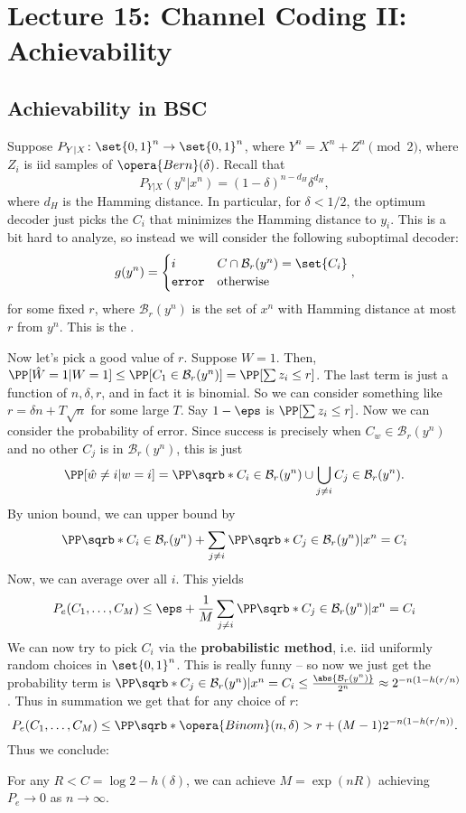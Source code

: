 \section*{Lecture 15: Channel Coding II: Achievability}
\setcounter{section}{15}

\subsection{Achievability in BSC}

Suppose $P_{Y|X} \colon \set{0,1}^n \to \set{0,1}^n$, where $Y^n = X^n + Z^n \pmod 2$, where $Z_i$ is iid samples of $\opera{Bern}(\delta)$.
Recall that \[
	P_{Y|X}(y^n|x^n) = (1-\delta)^{n-d_H} \delta^{d_H},
\]
where $d_H$ is the Hamming distance.
In particular, for $\delta < 1/2$, the optimum decoder just picks the $C_i$ that minimizes the Hamming distance to $y_i$.
This is a bit hard to analyze, so instead we will consider the following suboptimal decoder: \[
	g(y^n) = \begin{cases}
		i & C \cap \mathcal B_r(y^n) = \set{C_i} \\
		\texttt{error} & \text{otherwise}
	\end{cases},
\]
for some fixed $r$,
where $\mathcal B_r(y^n)$ is the set of $x^n$ with Hamming distance at most $r$ from $y^n$.
This is the .

Now let's pick a good value of $r$. Suppose $W = 1$. Then, $\PP[\hat W = 1 | W = 1] \leq \PP[C_1\in \mathcal B_r(y^n)] = \PP[\sum z_i \leq r]$. The last term is just a function of $n,\delta, r$, and in fact it is binomial. So we can consider something like $r = \delta n + T\sqrt n$ for some large $T$. Say $1-\eps$ is $\PP[\sum z_i \leq r]$.
Now we can consider the probability of error. Since success is precisely when $C_w\in \mathcal B_r(y^n)$ and no other $C_j$ is in $\mathcal B_r(y^n)$, this is just \[
	\PP[\hat w \neq i | w=i] = \PP\sqrb*{C_i \in \mathcal B_r(y^n) \cup \bigcup_{j\neq i} C_j\in\mathcal B_r(y^n)}.
\]
By union bound, we can upper bound by \[
	\PP\sqrb*{C_i \in \mathcal B_r(y^n)} + \sum_{j\neq i} \PP\sqrb*{C_j\in \mathcal B_r(y^n)|x^n = C_i}
\]
Now, we can average over all $i$. This yields \[
	P_e(C_1,\ldots, C_M) \leq \eps + \frac 1M\sum_{j\neq i} \PP\sqrb*{C_j \in \mathcal B_r(y^n)|x^n = C_i}
\]
We can now try to pick $C_i$ via the \textbf{probabilistic method}, i.e. iid uniformly random choices in $\set{0,1}^n$.
This is really funny -- so now we just get the probability term is $\PP\sqrb*{C_j \in \mathcal B_r(y^n)|x^n = C_i} \leq \frac{\abs{\mathcal B_r(y^n)}}{2^n} \approx 2^{-n(1-h(r/n)}$.
Thus in summation we get that for any choice of $r$: \[
	P_e(C_1,\ldots, C_M) \leq \PP\sqrb*{\opera{Binom}(n,\delta) > r} + (M-1) 2^{-n(1-h(r/n))}.
\]
Thus we conclude:
\begin{thm}
	For any $R < C = \log 2 - h(\delta)$, we can achieve $M = \exp(nR)$ achieving $P_e\to 0$ as $n\to\infty$.
\end{thm}

